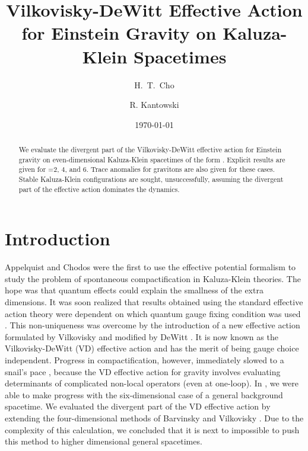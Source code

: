 \documentclass[a4paper,aps,preprint,groupedaddress,showpacs]{revtex4}
\begin{document}




\title{Vilkovisky-DeWitt Effective Action for Einstein Gravity
on Kaluza-Klein Spacetimes \coordHE{}}

\author{H.~T.~Cho}

\author{R. Kantowski}
\date{\today}
\begin{abstract}

We evaluate the divergent part of the Vilkovisky-DeWitt
effective action for Einstein gravity on even-dimensional Kaluza-Klein
spacetimes of the form \coordHE{}. 
Explicit results are given for \coordHE{}=2, 4, and 6.
Trace anomalies for gravitons are
also given for these cases.
Stable  Kaluza-Klein configurations are sought, unsuccessfully,  assuming 
the divergent part of the effective action dominates the dynamics.
\end{abstract}
\pacs{}
\maketitle
\newpage

\section{Introduction}


Appelquist and Chodos \cite{AC} were the first to use the effective potential formalism 
to study the  problem of spontaneous
compactification in Kaluza-Klein theories. 
The  hope was that  quantum effects could
explain the smallness of the extra dimensions. It was soon realized that 
results obtained using the standard effective action theory were dependent 
on which quantum gauge fixing condition was used
\cite{RDS,KL}. This non-uniqueness was overcome \cite{BO,HKLT}
by the introduction of a new
effective action formulated by Vilkovisky \cite{GV} and modified by
DeWitt \cite{BD1}. It is now known as the 
Vilkovisky-DeWitt (VD) effective action and has the merit of being 
gauge choice independent. 
Progress in compactification, however,  immediately slowed to a snail's pace 
\cite{BLO,SDOb,BKLM,BKO,BO1,BDO,TV,SDO}, 
because the VD effective
action for gravity involves evaluating determinants of complicated
non-local operators (even at one-loop). In \cite{CK1}, we were able to make 
progress with the 
six-dimensional case of a general background spacetime. We evaluated the 
divergent part
of the VD effective action by extending the four-dimensional
methods of Barvinsky and Vilkovisky \cite{BV}. Due to the complexity of this calculation,
we concluded that it is next to impossible to push this method to higher dimensional
general spacetimes.
\end{document}
